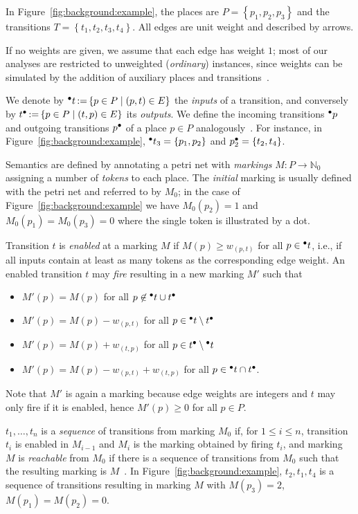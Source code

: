 In Figure~\ref{fig:background:example}, the places are $P=\left\{p_1,p_2,p_3\right\}$ and the transitions $T=\left\{t_1,t_2,t_3,t_4\right\}$. All edges are unit weight and described by arrows.

If no weights are given, we assume that each edge has weight $1$; most of our analyses are restricted to unweighted (\emph{ordinary}) instances, since weights can be simulated by the addition of auxiliary places and transitions~\cite{murata1989petri}.

We denote by ${}^\bullet t\mathop{\mathrel:=}\left\{p\in P\mid (p,t)\in E\right\}$ the \emph{inputs} of a transition, and conversely by $t{}^\bullet\mathop{\mathrel:=}\left\{p\in P\mid (t,p)\in E\right\}$ its \emph{outputs}. We define the incoming transitions ${}^\bullet p$ and outgoing transitions $p{}^\bullet$ of a place $p\in P$ analogously~\cite{murata1989petri}. For instance, in Figure~\ref{fig:background:example}, ${}^\bullet t_3=\left\{p_1,p_2\right\}$ and $p{}^\bullet_2=\left\{t_2,t_4\right\}$.

Semantics are defined by annotating a petri net with \emph{markings} $M:P\rightarrow\mathbb{N}_0$ assigning a number of \emph{tokens} to each place. The \emph{initial} marking is usually defined with the petri net and referred to by $M_0$; in the case of Figure~\ref{fig:background:example} we have $M_0(p_2)=1$ and $M_0(p_1)=M_0(p_3)=0$ where the single token is illustrated by a dot.

Transition $t$ is \emph{enabled} at a marking $M$ if $M(p)\ge w_{(p,t)}$ for all $p\in{}^\bullet t$, i.e., if all inputs contain at least as many tokens as the corresponding edge weight. An enabled transition $t$ may \emph{fire} resulting in a new marking $M'$ such that
\begin{itemize}
    \item $M'(p)=M(p)$ for all $p\not\in{}^\bullet t\cup t{}^\bullet$
    \item $M'(p)=M(p)-w_{(p,t)}$ for all $p\in{}^\bullet t\setminus t{}^\bullet$
    \item $M'(p)=M(p)+w_{(t,p)}$ for all $p\in t{}^\bullet\setminus{}^\bullet t$
    \item $M'(p)=M(p)-w_{(p,t)}+w_{(t,p)}$ for all $p\in{}^\bullet t\cap t{}^\bullet$.
\end{itemize}

Note that $M'$ is again a marking because edge weights are integers and $t$ may only fire if it is enabled, hence $M'(p)\ge 0$ for all $p\in P$.

$t_1,\ldots,t_n$ is a \emph{sequence} of transitions from marking $M_0$ if, for $1\le i\le n$, transition $t_i$ is enabled in $M_{i-1}$ and $M_i$ is the marking obtained by firing $t_i$, and marking $M$ is \emph{reachable} from $M_0$ if there is a sequence of transitions from $M_0$ such that the resulting marking is $M$~\cite{murata1989petri}. In Figure~\ref{fig:background:example}, $t_2,t_1,t_4$ is a sequence of transitions resulting in marking $M$ with $M(p_3)=2$, $M(p_1)=M(p_2)=0$.

